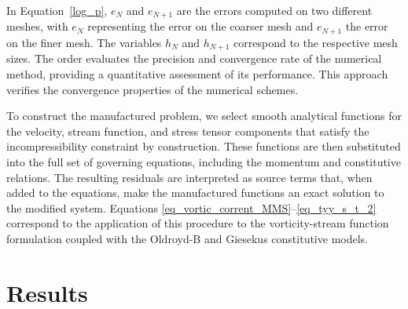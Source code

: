 \documentclass[preprint, 12pt]{elsarticle}
\begin{document}
In Equation~\eqref{log_p}, $e_{N}$ and $e_{N+1}$ are the errors computed on two different meshes, with $e_{N}$ representing the error on the coarser mesh and $e_{N+1}$ the error on the finer mesh. The variables $h_{N}$ and $h_{N+1}$ correspond to the respective mesh sizes. The order evaluates the precision and convergence rate of the numerical method, providing a quantitative assessment of its performance. This approach verifies the convergence properties of the numerical schemes.

To construct the manufactured problem, we select smooth analytical functions for the velocity, stream function, and stress tensor components that satisfy the incompressibility constraint by construction. These functions are then substituted into the full set of governing equations, including the momentum and constitutive relations. The resulting residuals are interpreted as source terms that, when added to the equations, make the manufactured functions an exact solution to the modified system. Equations \eqref{eq_vortic_corrent_MMS}–\eqref{eq_tyy_s_t_2} correspond to the application of this procedure to the vorticity-stream function formulation coupled with the Oldroyd-B and Giesekus constitutive models. %

\section{Results}\label{sec_Results}
\end{document}
